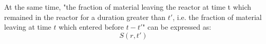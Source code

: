 At the same time, "the fraction of material leaving the reactor at time t which remained in the reactor for a duration greater than $t'$, i.e. the fraction of material leaving at time $t$ which entered before $t-t'$"  can be expressed as:
\begin{equation}
S(r,t') 
\end{equation}
